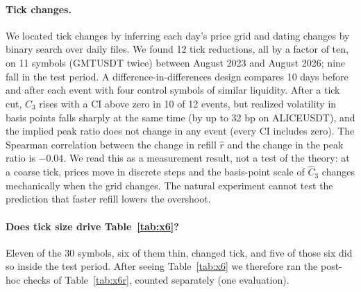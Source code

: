 \documentclass[12pt]{article}
\theoremstyle{definition}
\theoremstyle{remark}
\begin{document}
\paragraph{Tick changes.} We located tick changes by inferring each day's price grid and dating changes by binary search over daily files. We found 12 tick reductions, all by a factor of ten, on 11 symbols (GMTUSDT twice) between August 2023 and August 2026; nine fall in the test period. A difference-in-differences design compares 10 days before and after each event with four control symbols of similar liquidity. After a tick cut, $\hat C_3$ rises with a CI above zero in 10 of 12 events, but realized volatility in basis points falls sharply at the same time (by up to 32 bp on ALICEUSDT), and the implied peak ratio does not change in any event (every CI includes zero). The Spearman correlation between the change in refill $\hat r$ and the change in the peak ratio is $-0.04$. We read this as a measurement result, not a test of the theory: at a coarse tick, prices move in discrete steps and the basis-point scale of $\hat C_3$ changes mechanically when the grid changes. The natural experiment cannot test the prediction that faster refill lowers the overshoot.

\paragraph{Does tick size drive Table~\ref{tab:x6}?} Eleven of the 30 symbols, six of them thin, changed tick, and five of those six did so inside the test period. After seeing Table~\ref{tab:x6} we therefore ran the post-hoc checks of Table~\ref{tab:x6r}, counted separately (one evaluation).
\end{document}
